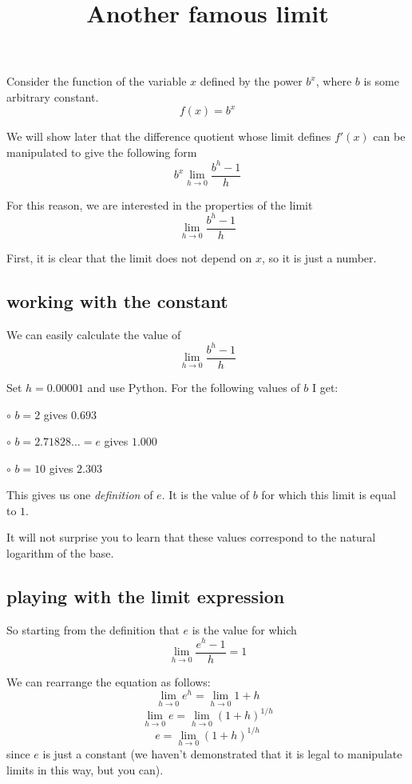 \documentclass[11pt, oneside]{article}
\title{Another famous limit}
\date{}
\begin{document}
\maketitle
\Large
Consider the function of the variable $x$ defined by the power $b^x$, where $b$ is some arbitrary constant.
\[ f(x) = b^x \]

We will show later that the difference quotient whose limit defines $f'(x)$ can be manipulated to give the following form
\[ b^x \lim_{h \rightarrow 0} \frac{b^{h}-1}{h} \]

For this reason, we are interested in the properties of the limit
\[ \lim_{h \rightarrow 0} \frac{b^{h}-1}{h} \]

First, it is clear that the limit does not depend on $x$, so it is just a number.

\subsection*{working with the constant}

We can easily calculate the value of
\[ \lim_{h \rightarrow 0} \frac{b^{h}-1}{h} \]

Set $h=0.00001$ and use Python.  For the following values of $b$ I get:

$\circ$  $b=2$ gives $0.693$

$\circ$  $b=2.71828 \dots = e$ gives $1.000$

$\circ$  $b=10$ gives $2.303$

This gives us one \emph{definition} of $e$.  It is the value of $b$ for which this limit is equal to $1$.

It will not surprise you to learn that these values correspond to the natural logarithm of the base.

\subsection*{playing with the limit expression}

So starting from the definition that $e$ is the value for which
\[ \lim_{h \rightarrow 0} \frac{e^{h}-1}{h} = 1 \]

We can rearrange the equation as follows:
\[ \lim_{h \rightarrow 0} e^{h} = \lim_{h \rightarrow 0} 1 + h \]
\[ \lim_{h \rightarrow 0}  e = \lim_{h \rightarrow 0} (1 + h)^{1/h} \]
\[ e = \lim_{h \rightarrow 0} (1 + h)^{1/h} \]
since $e$ is just a constant (we haven't demonstrated that it is legal to manipulate limits in this way, but you can).
\end{document}
